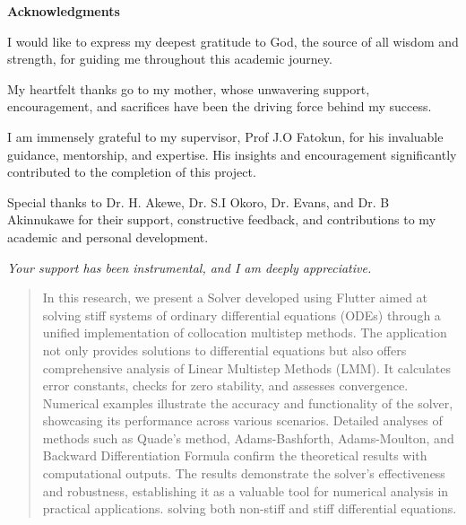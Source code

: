 \documentclass[a4paper, twoside]{report} %
\begin{document}
\begin{titlepage}
  
  \vspace*{2cm}
  \begin{center}
    {\LARGE\textbf{Acknowledgments}}
  \end{center}
 
  
  \vspace{1cm}
  \large
  I would like to express my deepest gratitude to God, the source of all wisdom and strength, for guiding me throughout this academic journey.

  \vspace{0.5cm}
  My heartfelt thanks go to my mother, whose unwavering support, encouragement, and sacrifices have been the driving force behind my success.

  \vspace{0.5cm}
  I am immensely grateful to my supervisor, Prof J.O Fatokun, for his invaluable guidance, mentorship, and expertise. His insights and encouragement significantly contributed to the completion of this project.

  \vspace{0.5cm}
  Special thanks to Dr. H. Akewe, Dr. S.I Okoro, Dr. Evans, and Dr. B Akinnukawe for their support, constructive feedback, and contributions to my academic and personal development.

  \vspace{2cm}
  \textit{Your support has been instrumental, and I am deeply appreciative.}
\end{titlepage}

\begin{abstract}
  In this research, we present a Solver developed using Flutter aimed at solving stiff systems of ordinary differential equations (ODEs) through a unified implementation of collocation multistep methods. The application not only provides solutions to differential equations but also offers comprehensive analysis of Linear Multistep Methods (LMM). It calculates error constants, checks for zero stability, and assesses convergence. Numerical examples illustrate the accuracy and functionality of the solver, showcasing its performance across various scenarios. Detailed analyses of methods such as Quade’s method, Adams-Bashforth, Adams-Moulton, and Backward Differentiation Formula confirm the theoretical results with computational outputs. The results demonstrate the solver's effectiveness and robustness, establishing it as a valuable tool for numerical analysis in practical applications. solving both non-stiff and stiff differential equations.
  \end{abstract}
\end{document}
